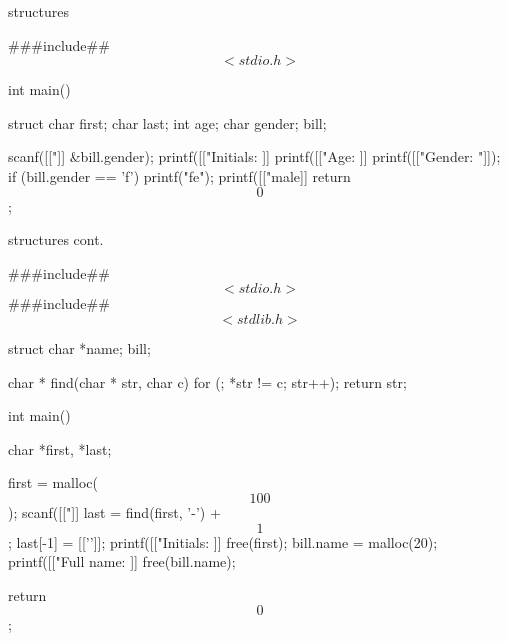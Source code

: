 \documentclass[10pt,t,svgnames]{beamer}
\begin{document}
  \begin{frame}[fragile]{structures}
    \begin{scriptsize}
      \begin{codeblock}[gobble=2]
        ###include## $$<stdio.h>$$

        int main() {
          struct {
            char first;
            char last;
            int age;
            char gender;
          } bill;

          scanf([["]]%
            &bill.gender);
          printf([["Initials: ]]%
          printf([["Age: ]]%
          printf([["Gender: "]]);
          if (bill.gender == 'f') {
            printf("fe");
          }
          printf([["male]]%
          return $$0$$;
        }
      \end{codeblock}
    \end{scriptsize}
  \end{frame}

  \begin{frame}[fragile]{structures cont.}
    \begin{scriptsize}
      \begin{codeblock}[gobble=2]
        ###include## $$<stdio.h>$$
        ###include## $$<stdlib.h>$$

        struct { char *name; } bill;

        char * find(char * str, char c) {
          for (; *str != c; str++);
          return str;
        }

        int main() {
          char *first, *last;

          first = malloc($$100$$);
          scanf([["]]%
          last = find(first, '-') + $$1$$;
          last[-1] = [['\0']];
          printf([["Initials: ]]%
          free(first);
          bill.name = malloc(20);
          printf([["Full name: ]]%
          free(bill.name);

          return $$0$$;
        }
      \end{codeblock}
    \end{scriptsize}
  \end{frame}
\end{document}
